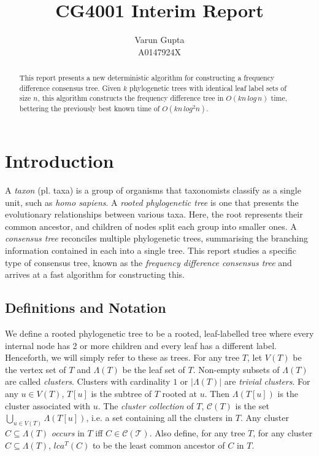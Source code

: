 \documentclass{article}
\title{CG4001 Interim Report}
\author{Varun Gupta\\A0147924X}
\newcommand{\leafset}{\Lambda}
\begin{document}
    \maketitle

    \begin{abstract}
        This report presents a new deterministic algorithm for constructing a frequency difference consensus tree. Given $k$ phylogenetic trees with identical leaf label sets of size $n$, this algorithm constructs the frequency difference tree in $O(kn\,log\,n)$ time, bettering the previously best known time of $O(kn\,log^2n)$.
    \end{abstract}


    \section{Introduction}
    \label{sec:introduction}

    A \textit{taxon} (pl. taxa) is a group of organisms that taxonomists classify as a single unit, such as \textit{homo sapiens}. A \textit{rooted phylogenetic tree} is one that presents the evolutionary relationships between various taxa. Here, the root represents their common ancestor, and children of nodes split each group into smaller ones. A \textit{consensus tree} reconciles multiple phylogenetic trees, summarising the branching information contained in each into a single tree. This report studies a specific type of consensus tree, known as the \textit{frequency difference consensus tree} and arrives at a fast algorithm for constructing this.

    \subsection{Definitions and Notation}
    We define a rooted phylogenetic tree to be a rooted, leaf-labelled tree where every internal node has 2 or more children and every leaf has a different label. Henceforth, we will simply refer to these as trees. For any tree $T$, let $V(T)$ be the vertex set of $T$ and $\leafset(T)$ be the leaf set of $T$. Non-empty subsets of $\leafset(T)$ are called \textit{clusters}. Clusters with cardinality $1$ or $|\leafset(T)|$ are \textit{trivial clusters}. For any $u \in V(T)$, $T[u]$ is the subtree of $T$ rooted at $u$. Then $\leafset(T[u])$ is the cluster associated with $u$. The \textit{cluster collection} of $T$, $\mathcal{C}(T)$ is the set $\bigcup_{u \in V(T)} {\leafset(T[u])}$, i.e. a set containing all the clusters in $T$. Any cluster $C \subseteq \leafset(T)$ \textit{occurs} in $T$ iff $C \in \mathcal{C(T)}$. Also define, for any tree $T$, for any cluster $C \subseteq \leafset(T)$, $lca^T(C)$ to be the least common ancestor of $C$ in $T$.\\
\end{document}
